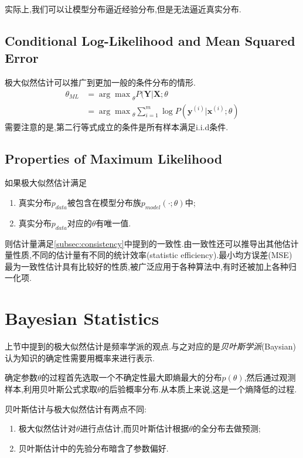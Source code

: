 实际上,我们可以让模型分布逼近经验分布,但是无法逼近真实分布.

\subsection{Conditional Log-Likelihood and Mean Squared Error}

极大似然估计可以推广到更加一般的条件分布的情形.
\begin{equation}\begin{split}
\theta_{ML}&={\arg\max}_\theta P(\mathbf Y|\mathbf X;\theta\\
&={\arg\max}_\theta\sum_{i=1}^m\log P(\mathbf y^{(i)}|\mathbf x^{(i)};\theta)
\end{split}\end{equation}
需要注意的是,第二行等式成立的条件是所有样本满足i.i.d条件.

\subsection{Properties of Maximum Likelihood}

如果极大似然估计满足
\begin{enumerate}
\item 真实分布$p_{data}$被包含在模型分布族$p_{model}(\cdot;\theta)$中;
\item 真实分布$p_{data}$对应的$\theta$有唯一值.
\end{enumerate}
则估计量满足\ref{subsec:consistency}中提到的一致性.由一致性还可以推导出其他估计量性质,不同的估计量有不同的统计效率(statistic efficiency).最小均方误差(MSE)最为一致性估计具有比较好的性质,被广泛应用于各种算法中,有时还被加上各种归一化项.

\section{Bayesian Statistics}

上节中提到的极大似然估计是频率学派的观点.与之对应的是\textit{贝叶斯学派}(Baysian)认为知识的确定性需要用概率来进行表示.

确定参数$\theta$的过程首先选取一个不确定性最大即熵最大的分布$p(\theta)$,然后通过观测样本,利用贝叶斯公式求取$\theta$的后验概率分布.从本质上来说,这是一个熵降低的过程.

贝叶斯估计与极大似然估计有两点不同:
\begin{enumerate}
\item 极大似然估计对$\theta$进行点估计,而贝叶斯估计根据$\theta$的全分布去做预测;
\item 贝叶斯估计中的先验分布暗含了参数偏好.
\end{enumerate}

